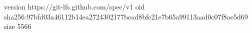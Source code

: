 version https://git-lfs.github.com/spec/v1
oid sha256:97bfd03a46112b14ea2724302177bead8bfe21e7b65a99113aad0c07f8ae5d69
size 5566
